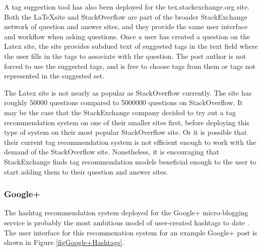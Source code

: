\documentclass[man,floatsintext]{apa6}
\begin{document}
A tag suggestion tool has also been deployed for the tex.stackexchange.org site. \parencite{LatexTags2013}
Both the \LaTeX site and StackOverflow are part of the broader StackExchange network of question and answer sites, and they provide the same user interface and workflow when asking questions.
Once a user has created a question on the Latex site, the site provides subdued text of suggested tags in the text field where the user fills in the tags to associate with the question.
The post author is not forced to use the suggested tags, and is free to choose tags from them or tags not represented in the suggested set.

The Latex site is not nearly as popular as StackOverflow currently.
The site has roughly \num{50000} questions compared to \num{5000000} questions on StackOverflow.
It may be the case that the StackExchange company decided to try out a tag recommendation system on one of their smaller sites first, before deploying this type of system on their most popular StackOverflow site.
Or it is possible that their current tag recommendation system is not efficient enough to work with the demand of the StackOverflow site.
Nonetheless, it is encouraging that StackExchange finds tag recommendation models beneficial enough to the user to start adding them to their question and answer sites. 

\subsubsection{Google+}

The hashtag recommendation system deployed for the Google+ micro-blogging service is probably the most ambitious model of user-created hashtags to date \parencite{GoogleKeynote2013}.
The user interface for this recommenation system for an example Google+ post is shown in Figure \ref{figGoogle+Hashtags}.
\end{document}
